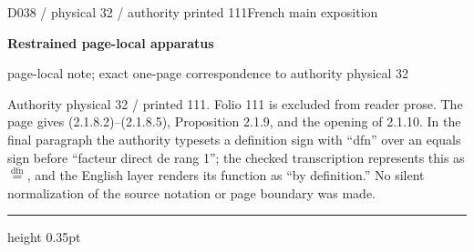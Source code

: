 \documentclass[9pt]{article}
\newcommand{\CanonText}[1]{\par{\fontsize{8.0}{9.35}\selectfont\RaggedRight #1\par}\vspace{2.2pt}}
\newcommand{\LayerTitle}{Restrained page-local apparatus}
\begin{document}
\noindent\begin{minipage}[t][\dimexpr\textheight-5pt\relax][t]{\textwidth}
{\sffamily\fontsize{7.3}{8.2}\selectfont\color{Quiet} D038 / physical 32 / authority printed 111\hfill French main exposition}
\par{}\vspace{4.5pt}
{\sffamily\fontsize{10.4}{11.6}\selectfont\bfseries\color{Accent} \LayerTitle}
\par{\sffamily\fontsize{6.7}{7.7}\selectfont\color{Quiet} page-local note; exact one-page correspondence to authority physical 32}
\vspace{5pt}
\CanonText{Authority physical 32 / printed 111. Folio 111 is excluded from reader prose. The page gives (2.1.8.2)–(2.1.8.5), Proposition 2.1.9, and the opening of 2.1.10. In the final paragraph the authority typesets a definition sign with “dfn” over an equals sign before “facteur direct de rang 1”; the checked transcription represents this as \(\overset{\mathrm{dfn}}{=}\), and the English layer renders its function as “by definition.” No silent normalization of the source notation or page boundary was made.}
\vfill
{\color{Accent}\hrule height 0.35pt}\vspace{3pt}
\end{minipage}
\newpage
\end{document}
